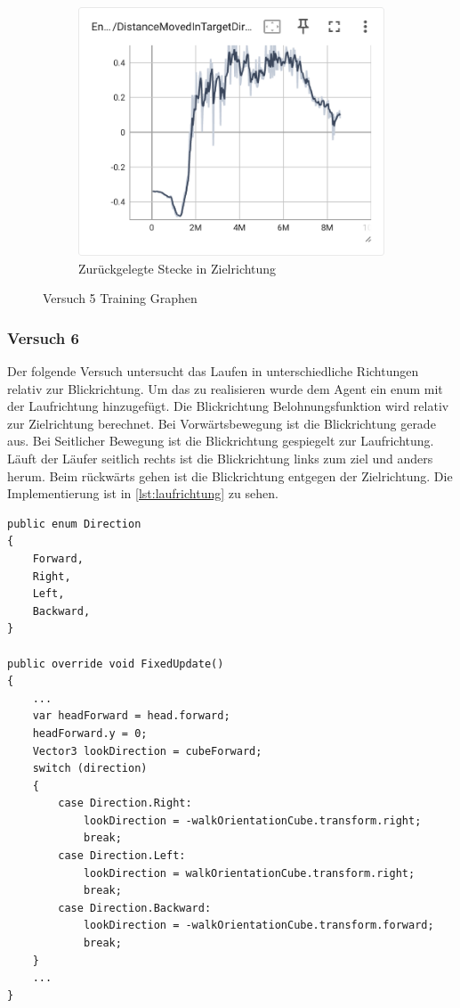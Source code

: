 \begin{figure}[H]
    \begin{subfigure}{.49\textwidth}
      \centering  
      \includegraphics[width=\textwidth]{img/128_move_target_dir}
      \caption{Zurückgelegte Stecke in Zielrichtung}
      \label{fig:128_move_target_dir}
    \end{subfigure}
  \caption{Versuch 5 Training Graphen}
  \label{fig:versuch5_training}
\end{figure}

\subsubsection{Versuch 6}
Der folgende Versuch untersucht das Laufen in unterschiedliche Richtungen relativ zur Blickrichtung. Um das zu realisieren wurde dem Agent ein enum mit der Laufrichtung hinzugefügt. Die Blickrichtung Belohnungsfunktion wird relativ zur Zielrichtung berechnet. Bei Vorwärtsbewegung ist die Blickrichtung gerade aus. Bei Seitlicher Bewegung ist die Blickrichtung gespiegelt zur Laufrichtung. Läuft der Läufer seitlich rechts ist die Blickrichtung links zum ziel und anders herum. Beim rückwärts gehen ist die Blickrichtung entgegen der Zielrichtung. Die Implementierung ist in \ref{lst:laufrichtung} zu sehen.

\begin{lstlisting}[caption={Laufrichtung Enum, Beobachtung und Belohnung},captionpos=b,label={lst:laufrichtung}]
public enum Direction
{
    Forward,
    Right,
    Left,
    Backward,
}
    
public override void FixedUpdate()
{
    ...
    var headForward = head.forward;
    headForward.y = 0;
    Vector3 lookDirection = cubeForward;
    switch (direction)
    {
        case Direction.Right:
            lookDirection = -walkOrientationCube.transform.right;
            break;
        case Direction.Left:
            lookDirection = walkOrientationCube.transform.right;
            break;
        case Direction.Backward:
            lookDirection = -walkOrientationCube.transform.forward;
            break;
    }
    ...
}
\end{lstlisting}

